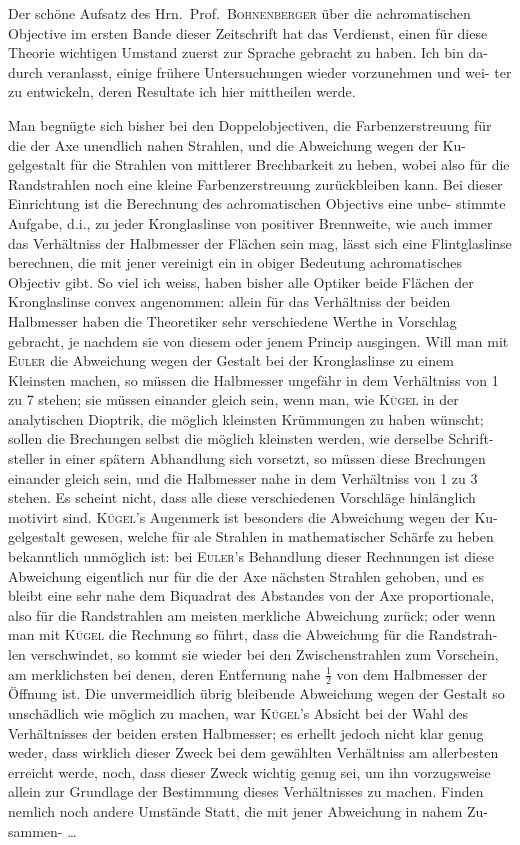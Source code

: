 \documentclass[12pt,a4paper]{article}
\begin{document}
Der schöne Aufsatz des Hrn.\ Prof.\ \textsc{Bohnenberger} über die achromatischen 
Objective im ersten Bande dieser Zeitschrift hat das Verdienst, einen für diese 
Theorie wichtigen Umstand zuerst zur Sprache gebracht zu haben. Ich bin da-
durch veranlasst, einige frühere Untersuchungen wieder vorzunehmen und wei-
ter zu entwickeln, deren Resultate ich hier mittheilen werde.

Man begnügte sich bisher bei den Doppelobjectiven, die Farbenzerstreuung 
für die der Axe unendlich nahen Strahlen, und die Abweichung wegen der Ku-
gelgestalt für die Strahlen von mittlerer Brechbarkeit zu heben, wobei also für 
die Randstrahlen noch eine kleine Farbenzerstreuung zurückbleiben kann. Bei 
dieser Einrichtung ist die Berechnung des achromatischen Objectivs eine unbe-
stimmte Aufgabe, d.i., zu jeder Kronglaslinse von positiver Brennweite, wie 
auch immer das Verhältniss der Halbmesser der Flächen sein mag, lässt sich 
eine Flintglaslinse berechnen, die mit jener vereinigt ein in obiger Bedeutung 
achromatisches Objectiv gibt. So viel ich weiss, haben bisher alle Optiker beide 
Flächen der Kronglaslinse convex angenommen: allein für das Verhältniss der 
beiden Halbmesser haben die Theoretiker sehr verschiedene Werthe in Vorschlag 
gebracht, je nachdem sie von diesem oder jenem Princip ausgingen. Will man 
mit \textsc{Euler} die Abweichung wegen der Gestalt bei der Kronglaslinse zu einem 
Kleinsten machen, so müssen die Halbmesser ungefähr in dem Verhältniss von 
1 zu 7 stehen; sie müssen einander gleich sein, wenn man, wie \textsc{Kügel} in der 
analytischen Dioptrik, die möglich kleinsten Krümmungen zu haben wünscht; 
sollen die Brechungen selbst die möglich kleinsten werden, wie derselbe Schrift-
steller in einer spätern Abhandlung sich vorsetzt, so müssen diese Brechungen 
einander gleich sein, und die Halbmesser nahe in dem Verhältniss von 1 zu 3 
stehen. Es scheint nicht, dass alle diese verschiedenen Vorschläge hinlänglich 
motivirt sind. \textsc{Kügel}'s Augenmerk ist besonders die Abweichung wegen der Ku-
gelgestalt gewesen, welche für ale Strahlen in mathematischer Schärfe zu heben 
bekanntlich unmöglich ist: bei \textsc{Euler}'s Behandlung dieser Rechnungen ist diese 
Abweichung eigentlich nur für die der Axe nächsten Strahlen gehoben, und es 
bleibt eine sehr nahe dem Biquadrat des Abstandes von der Axe proportionale, 
also für die Randstrahlen am meisten merkliche Abweichung zurück; oder wenn 
man mit \textsc{Kügel} die Rechnung so führt, dass die Abweichung für die Randstrah-
len verschwindet, so kommt sie wieder bei den Zwischenstrahlen zum Vorschein, 
am merklichsten bei denen, deren Entfernung nahe $\tfrac{1}{2}$ von dem Halbmesser der 
Öffnung ist. Die unvermeidlich übrig bleibende Abweichung wegen der Gestalt 
so unschädlich wie möglich zu machen, war \textsc{Kügel}'s Absicht bei der Wahl des 
Verhältnisses der beiden ersten Halbmesser; es erhellt jedoch nicht klar genug 
weder, dass wirklich dieser Zweck bei dem gewählten Verhältniss am allerbesten 
erreicht werde, noch, dass dieser Zweck wichtig genug sei, um ihn vorzugsweise 
allein zur Grundlage der Bestimmung dieses Verhältnisses zu machen. Finden 
nemlich noch andere Umstände Statt, die mit jener Abweichung in nahem Zu-
sammen-
\ldots
\end{document}

